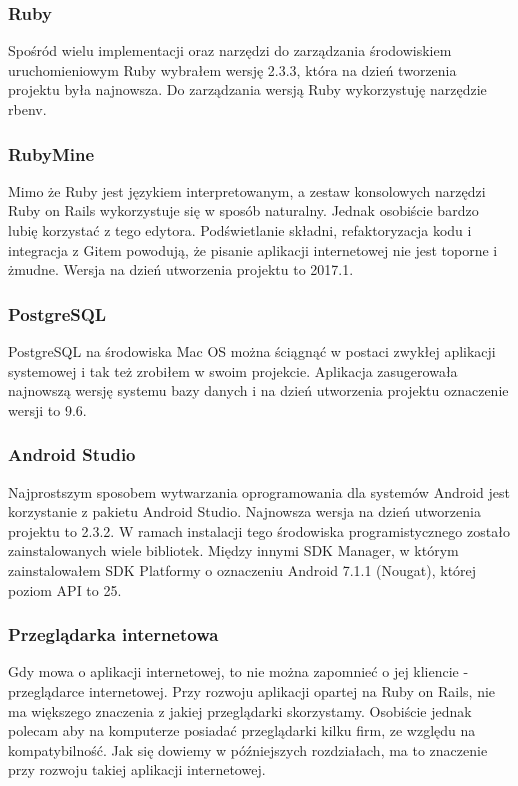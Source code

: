 \subsubsection{Ruby}
Spośród wielu implementacji oraz narzędzi do zarządzania środowiskiem uruchomieniowym Ruby wybrałem wersję 2.3.3, która na dzień tworzenia projektu była najnowsza. Do zarządzania wersją Ruby wykorzystuję narzędzie rbenv.

\subsubsection{RubyMine}
Mimo że Ruby jest językiem interpretowanym, a zestaw konsolowych narzędzi Ruby on Rails wykorzystuje się w sposób naturalny. Jednak osobiście bardzo lubię korzystać z tego edytora. Podświetlanie składni, refaktoryzacja kodu i integracja z Gitem powodują, że pisanie aplikacji internetowej nie jest toporne i żmudne. Wersja na dzień utworzenia projektu to 2017.1.

\subsubsection{PostgreSQL}
PostgreSQL na środowiska Mac OS można ściągnąć w postaci zwykłej aplikacji systemowej i tak też zrobiłem w swoim projekcie. Aplikacja zasugerowała najnowszą wersję systemu bazy danych i na dzień utworzenia projektu oznaczenie wersji to 9.6.

\subsubsection{Android Studio}
Najprostszym sposobem wytwarzania oprogramowania dla systemów Android jest korzystanie z pakietu Android Studio. Najnowsza wersja na dzień utworzenia projektu to 2.3.2. W ramach instalacji tego środowiska programistycznego zostało zainstalowanych wiele bibliotek. Między innymi SDK Manager, w którym zainstalowałem SDK Platformy o oznaczeniu Android 7.1.1 (Nougat), której poziom API to 25.

\subsubsection{Przeglądarka internetowa}
Gdy mowa o aplikacji internetowej, to nie można zapomnieć o jej kliencie - przeglądarce internetowej. Przy rozwoju aplikacji opartej na Ruby on Rails, nie ma większego znaczenia z jakiej przeglądarki skorzystamy. Osobiście jednak polecam aby na komputerze posiadać przeglądarki kilku firm, ze względu na kompatybilność. Jak się dowiemy w późniejszych rozdziałach, ma to znaczenie przy rozwoju takiej aplikacji internetowej.

